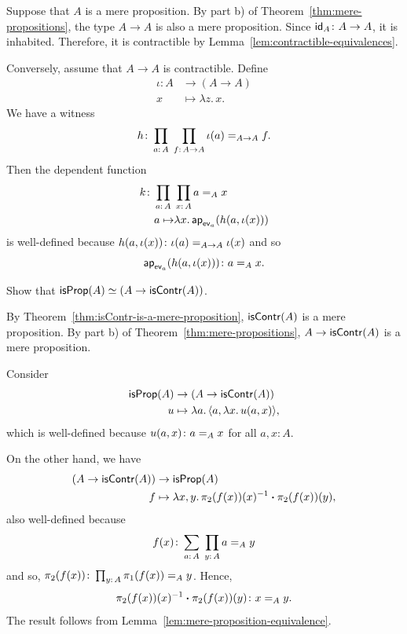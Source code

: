 \begin{solution}
    Suppose that $A$ is a mere proposition. By part b) of Theorem~\ref{thm:mere-propositions}, the type $A\to A$ is also a mere proposition. Since $\id_A\colon A\to A$, it is inhabited. Therefore, it is contractible by Lemma~\ref{lem:contractible-equivalences}.

    Conversely, assume that $A\to A$ is contractible. Define
    \begin{align*}
        \iota\colon A&\to(A\to A)\\
        x&\mapsto\lambda z.\,x.
    \end{align*}
    We have a witness
    \[
        h\colon\prod_{a\colon A}\;\prod_{f\colon A\to A}\iota(a)\eq{A\to A}f.
    \]
    Then the dependent function
    \begin{align*}
        k\colon\prod_{a\colon A}\;&\prod_{x\colon A}a\eq Ax\\
        a\mapsto&\lambda x.\,\fun{ap}_{\fun{ev}_a}(h(a,\iota(x)))
    \end{align*}
    is well-defined because $h(a,\iota(x))\colon\iota(a)\eq{A\to A}\iota(x)$ and so
    \[
        \fun{ap}_{\fun{ev}_a}(h(a,\iota(x)))\colon a\eq Ax.
    \]
\end{solution}

\begin{exr}\fe
    Show that\/ $\mathsf{isProp}(A)\simeq(A\to\mathsf{isContr}(A))$.
\end{exr}

\begin{solution}
    By Theorem~\ref{thm:isContr-is-a-mere-proposition}, $\mathsf{isContr}(A)$ is a mere proposition. By part b) of Theorem~\ref{thm:mere-propositions}, $A\to\mathsf{isContr}(A)$ is a mere proposition.

    Consider
    \begin{align*}
        \mathsf{isProp}(A)&\to(A\to\mathsf{isContr}(A))\\
        u&\mapsto\lambda a.\,\langle a,\lambda x.\,u(a,x)\rangle,
    \end{align*}
    which is well-defined because $u(a,x)\colon a\eq Ax$ for all $a,x\colon A$.

    On the other hand, we have
    \begin{align*}
        (A\to\mathsf{isContr}(A))&\to\mathsf{isProp}(A)\\
        f&\mapsto\lambda x,y.\,\pi_2(f(x))(x)^{-1}\mathbin{\boldsymbol{\cdot}}\pi_2(f(x))(y),
    \end{align*}
    also well-defined because
    \[
        f(x)\colon\sum_{a\colon A}\;\prod_{y\colon A}a\eq Ay
    \]
    and so, $\pi_2(f(x))\colon\prod_{y\colon A}\pi_1(f(x))\eq Ay$. Hence,
    \[
        \pi_2(f(x))(x)^{-1}\ct\pi_2(f(x))(y)\colon x\eq Ay.
    \]
    The result follows from Lemma~\ref{lem:mere-proposition-equivalence}.
\end{solution}

